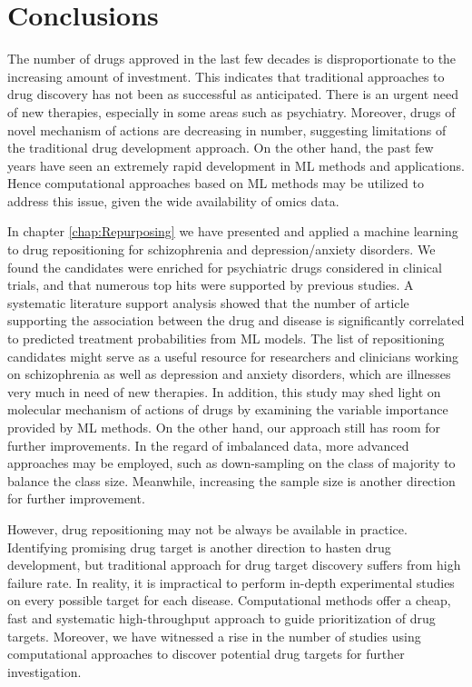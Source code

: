 \chapter{Conclusions}
  The number of drugs approved in the last few decades is disproportionate to the increasing amount of investment. This indicates that traditional approaches to drug discovery has not been as successful as anticipated. There is an urgent need of new therapies, especially in some areas such as psychiatry. Moreover, drugs of novel mechanism of actions are decreasing in number, suggesting limitations of the traditional drug development approach. On the other hand, the past few years have seen an extremely rapid development in ML methods and applications. Hence computational approaches based on ML methods may be utilized to address this issue, given the wide availability of omics data. 

  In chapter \ref{chap:Repurposing} we have presented and applied a machine learning to drug repositioning for schizophrenia and depression/anxiety disorders. We found the candidates were enriched for psychiatric drugs considered in clinical trials, and that numerous top hits were supported by previous studies. A systematic literature support analysis showed that the number of article supporting the association between the drug and disease is significantly correlated to predicted treatment probabilities from ML models. The list of repositioning candidates might serve as a useful resource for researchers and clinicians working on schizophrenia as well as depression and anxiety disorders, which are illnesses very much in need of new therapies. In addition, this study may shed light on molecular mechanism of actions of drugs by examining the variable importance provided by ML methods. On the other hand, our approach still has room for further improvements. In the regard of imbalanced data, more advanced approaches may be employed, such as down-sampling on the class of majority to balance the class size. Meanwhile, increasing the sample size is another direction for further improvement. 
  
  However, drug repositioning may not be always be available in practice. Identifying promising drug target is another direction to hasten drug development, but traditional approach for drug target discovery suffers from high failure rate. In reality, it is impractical to perform in-depth experimental studies on every possible target for each disease. Computational methods offer a cheap, fast and systematic high-throughput approach to guide prioritization of drug targets. Moreover, we have witnessed a rise in the number of studies using computational approaches to discover potential drug targets for further investigation.

